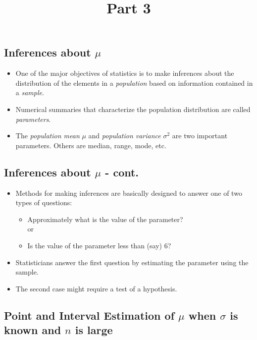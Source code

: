 \documentclass[
  letterpaper,
  DIV=11,
  numbers=noendperiod]{scrartcl}
\title{Part 3}
\author{}
\date{}
\begin{document}
\maketitle


\subsection{\texorpdfstring{Inferences about
\(\mu\)}{Inferences about \textbackslash mu}}\label{inferences-about-mu}

\begin{itemize}
\item
  One of the major objectives of statistics is to make inferences about
  the distribution of the elements in a {\emph{population}} based on
  information contained in a {\emph{sample}}.
\item
  Numerical summaries that characterize the population distribution are
  called {\emph{parameters}}.
\item
  The {\emph{population mean}} \(\mu\) and {\emph{population variance}}
  \(\sigma^2\) are two important parameters. Others are median, range,
  mode, etc.
\end{itemize}

\subsection{\texorpdfstring{Inferences about \(\mu\) -
cont.}{Inferences about \textbackslash mu - cont.}}\label{inferences-about-mu---cont.}

\begin{itemize}
\item
  Methods for {making inferences} are basically designed to answer one
  of two types of questions:

  \begin{itemize}
  \item
    Approximately what is the value of the parameter?\\
    or
  \item
    Is the value of the parameter less than (say) 6?
  \end{itemize}
\item
  Statisticians answer the first question by {estimating} the parameter
  using the sample.
\item
  The second case might require a {test of a hypothesis}.
\end{itemize}

\subsection{\texorpdfstring{Point and Interval Estimation of \(\mu\)
when \(\sigma\) is known and \(n\) is
large}{Point and Interval Estimation of \textbackslash mu when \textbackslash sigma is known and n is large}}\label{point-and-interval-estimation-of-mu-when-sigma-is-known-and-n-is-large}
\end{document}

